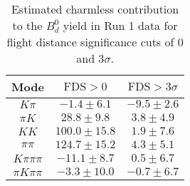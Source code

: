 \begin{table}[h]
  \centering
  \begin{tabular}{ccc}
      \toprule
      Mode & $\mathrm{FDS} > 0$ & $\mathrm{FDS} > 3\sigma$ \\
      \midrule
      $K\pi$ & $-1.4 \pm 6.1$ & $-9.5 \pm 2.6$ \\
      $\pi K$ & $28.8 \pm 9.8$ & $3.8 \pm 4.9$ \\
      $KK$ & $100.0 \pm 15.8$ & $1.9 \pm 7.6$ \\
      $\pi\pi$ & $124.7 \pm 15.2$ & $4.3 \pm 5.1$ \\
      $K\pi\pi\pi$ & $-11.1 \pm 8.7$ & $0.5 \pm 6.7$ \\
      $\pi K\pi\pi$ & $-3.3 \pm 10.0$ & $-0.7 \pm 6.7$ \\
      \bottomrule
  \end{tabular}
  \caption{\small Estimated charmless contribution to the $B^{0}_{d}$ yield in Run 1 data for flight distance significance cuts of 0  and $3\sigma$.}
\label{tab:charmless_yields_Bd_run_1}
\end{table}
